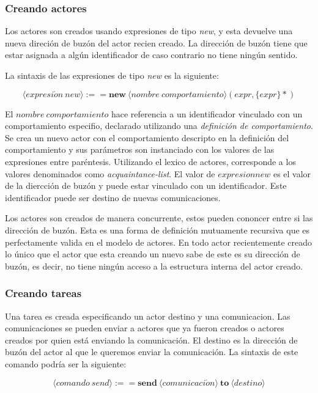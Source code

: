 \subsubsection*{Creando actores}

Los actores son creados usando expresiones de tipo \textit{new}, y esta devuelve una nueva direción de buzón del actor recien creado. La dirección de buzón tiene que estar asignada a algún identificador de caso contrario no tiene ningún sentido.

La sintaxis de las expresiones de tipo \textit{new} es la siguiente:

\[
   \langle expresi\acute{o}n\ new \rangle :== \textbf{new}\ \langle nombre\ comportamiento \rangle (expr, \{expr\}*)  
\]

El $nombre\ comportamiento$ hace referencia a un identificador vinculado con un comportamiento especifio, declarado utilizando una \textit{definición de comportamiento}. Se crea un nuevo actor con el comportamiento descripto en la definición del comportamiento y sus parámetros son instanciado con los valores de las expresiones entre paréntesis. Utilizando el lexico de actores, corresponde a los valores denominados como \textit{acquaintance-list}. El valor de $expresion new$ es el valor de la diercción de buzón y puede estar vinculado con un identificador. Este identificador puede ser destino de nuevas comunicaciones. 

Los actores son creados de manera concurrente, estos pueden cononcer entre si las dirección de buzón. Esta es una forma de definición mutuamente recursiva que es perfectamente valida en el modelo de actores. En todo actor recientemente creado lo único que el actor que esta creando un nuevo sabe de este es su dirección de buzón, es decir, no tiene ningún acceso a la estructura interna del actor creado.

\subsubsection*{Creando tareas}

Una tarea es creada especificando un actor destino y una comunicacion. Las comunicaciones se pueden enviar a actores que ya fueron creados o actores creados por quien está enviando la comunicación. El destino es la dirección de buzón del actor al que le queremos enviar la comunicación. La sintaxis de este comando podría ser la siguiente:

\[
  \langle comando\ send \rangle :== \textbf{send}\ \langle comunicaci\acute{o}n \rangle\ \textbf{to}\ \langle destino \rangle
\]

